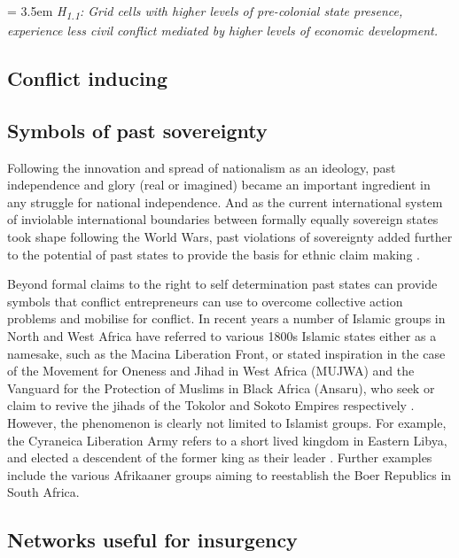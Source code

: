 \documentclass[12pt]{article}
\begin{document}
\begin{multicols}{2}
\bigskip

\hangindent = 3.5em \textit{H\textsubscript{1.1}: Grid cells with higher levels
of pre-colonial state presence, experience less civil conflict mediated by
higher levels of economic development.} 

\bigskip

\subsection{Conflict inducing}

\subsection{Symbols of past sovereignty}

Following the innovation and spread of nationalism as an ideology, past
independence and glory (real or imagined) became an important ingredient in any
struggle for national independence. And as the current international system of
inviolable international boundaries between formally equally sovereign states
took shape following the World Wars, past violations of sovereignty added
further to the potential of past states to provide the basis for ethnic claim
making \citep{Ahram2019, Shelef2016}. 

Beyond formal claims to the right to self determination past states can provide
symbols that conflict entrepreneurs can use to overcome collective action
problems and mobilise for conflict. In recent years a number of Islamic groups
in North and West Africa have referred to various 1800s Islamic states either as
a namesake, such as the Macina Liberation Front, or stated inspiration in the
case of the Movement for Oneness and Jihad in West Africa (MUJWA) and the
Vanguard for the Protection of Muslims in Black Africa (Ansaru), who seek or
claim to revive the jihads of the Tokolor and Sokoto Empires respectively
\citep{Zenn2015}. However, the phenomenon is clearly not limited to Islamist
groups. For example, the Cyraneica Liberation Army refers to a short lived
kingdom in Eastern Libya, and elected a descendent of the former king as their
leader \citep{Ahram2019}. Further examples include the various Afrikaaner groups
aiming to reestablish the Boer Republics in South Africa.

\subsection{Networks useful for insurgency}


\end{multicols}
\end{document}
